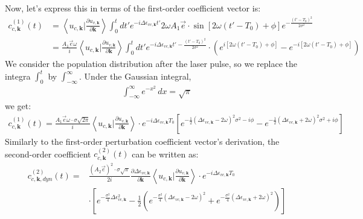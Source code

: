 Now, let's express this in terms of the first-order coefficient vector is:
\begin{equation}
\begin{aligned}
     c^{(1)}_{c,\mathbf k}(t) &= \left \langle u_{c,\mathbf k}\Big |\frac{\partial u_{v,\mathbf k}}{\partial \mathbf k} \right \rangle \int_0^t dt' e^{-i \Delta \epsilon_{vc,\mathbf k}t'} 
      2\omega A_1 \vec e \cdot \sin[2\omega (t'-T_0)+\phi]  e^{-\frac{(t'-T_0)^2}{2\sigma^2}}\\
      &=\frac{A_1 \vec e \omega }{i} \left \langle u_{c,\mathbf k}\Big |\frac{\partial u_{v,\mathbf k}}{\partial \mathbf k} \right \rangle \int_0^t dt' e^{-i \Delta \epsilon_{vc,\mathbf k}t' - \frac{(t'-T_0)^2}{2\sigma^2}} 
      \cdot (e^{i[2\omega (t'-T_0)+\phi]}-e^{-i[2\omega (t'-T_0)+\phi]}) 
\end{aligned}
\end{equation}
We consider the population distribution after the laser pulse, so we replace the integra $\int_0^t$ by $\int_{-\infty}^\infty$. Under the Gaussian integral, 
\begin{align}
\int_{-\infty}^{\infty} e^{-x^2} \, dx = \sqrt{\pi}
\end{align}
we get:
\begin{equation}
\begin{aligned}
     c^{(1)}_{c,\mathbf k}(t) = \frac{A_1 \vec e \omega  \cdot \sigma \sqrt{2\pi}}{i} \left \langle u_{c,\mathbf k}\Big |\frac{\partial u_{v,\mathbf k}}{\partial \mathbf k} \right \rangle \cdot  e^{-i\Delta \epsilon_{vc,\mathbf k} T_0}
    [e^{-\frac{1}{2}(\Delta \epsilon_{vc,\mathbf k} - 2\omega )^2 \sigma^2-i\phi}
    -e^{-\frac{1}{2}(\Delta \epsilon_{vc,\mathbf k} + 2\omega )^2 \sigma^2+i\phi}]
\end{aligned}
\end{equation}
Similarly to the first-order perturbation coefficient vector's derivation, the second-order coefficient $c^{(2)}_{c,\mathbf k}(t)$ can be written as:
\begin{equation}
\begin{aligned}
    c^{(2)}_{c,\mathbf k,dyn}(t)=&\frac{(A_2 \vec e)^2 \cdot \sigma \sqrt{\pi}}{2i} \frac{\partial
    \Delta \epsilon_{vc,\mathbf k}}{\partial \mathbf k} \left \langle u_{c,\mathbf k}\Big |\frac{\partial
u_{v,\mathbf k}}{\partial \mathbf k} \right \rangle \cdot e^{-i\Delta \epsilon_{vc,\mathbf k} T_0}\\
    &\cdot [e^{-\frac{\sigma^2}{4} \Delta \epsilon_{vc,\mathbf k} ^2}-\frac{1}{2}(e^{-\frac{\sigma^2}{4} (\Delta \epsilon_{vc,\mathbf k}-2\omega )^2}+e^{-\frac{\sigma^2}{4} (\Delta \epsilon_{vc,\mathbf k}+2\omega )^2})]
\end{aligned}
\end{equation}

